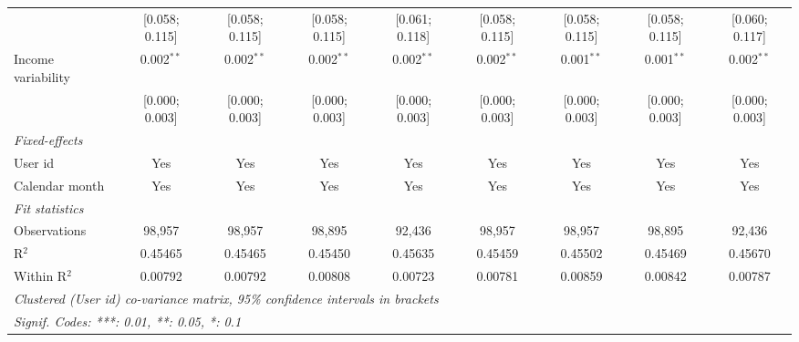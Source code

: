 \begin{table}[htbp]
\begin{threeparttable}[b]
\begin{tabular}{lcccccccc}
                                          & [0.058; 0.115] & [0.058; 0.115] & [0.058; 0.115] & [0.061; 0.118]  & [0.058; 0.115]  & [0.058; 0.115]   & [0.058; 0.115]   & [0.060; 0.117]\\   
         Income variability               & 0.002$^{**}$   & 0.002$^{**}$   & 0.002$^{**}$   & 0.002$^{**}$    & 0.002$^{**}$    & 0.001$^{**}$     & 0.001$^{**}$     & 0.002$^{**}$\\   
                                          & [0.000; 0.003] & [0.000; 0.003] & [0.000; 0.003] & [0.000; 0.003]  & [0.000; 0.003]  & [0.000; 0.003]   & [0.000; 0.003]   & [0.000; 0.003]\\   
         \midrule
         \emph{Fixed-effects}\\
         User id                          & Yes            & Yes            & Yes            & Yes             & Yes             & Yes              & Yes              & Yes\\  
         Calendar month                   & Yes            & Yes            & Yes            & Yes             & Yes             & Yes              & Yes              & Yes\\  
         \midrule
         \emph{Fit statistics}\\
         Observations                     & 98,957         & 98,957         & 98,895         & 92,436          & 98,957          & 98,957           & 98,895           & 92,436\\  
         R$^2$                            & 0.45465        & 0.45465        & 0.45450        & 0.45635         & 0.45459         & 0.45502          & 0.45469          & 0.45670\\  
         Within R$^2$                     & 0.00792        & 0.00792        & 0.00808        & 0.00723         & 0.00781         & 0.00859          & 0.00842          & 0.00787\\  
         \midrule \midrule
         \multicolumn{9}{l}{\emph{Clustered (User id) co-variance matrix, 95\% confidence intervals in brackets}}\\
         \multicolumn{9}{l}{\emph{Signif. Codes: ***: 0.01, **: 0.05, *: 0.1}}\\
      \end{tabular}
   \end{threeparttable}
\end{table}


